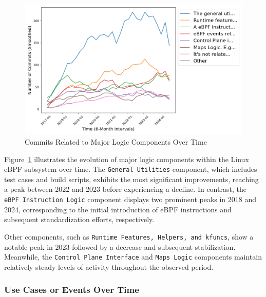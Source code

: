 \begin{figure}[ht]
    \centering
    \includegraphics[width=\linewidth]{feature-analysis/timeline_major_related_logic_component_smoothed.png}
    \caption{Commits Related to Major Logic Components Over Time}
    \label{fig:timeline_major_related_logic_component_smoothed}
\end{figure}

Figure~\ref{fig:timeline_major_related_logic_component_smoothed} illustrates the evolution of major logic components within the Linux eBPF subsystem over time. The \texttt{General Utilities} component, which includes test cases and build scripts, exhibits the most significant improvements, reaching a peak between 2022 and 2023 before experiencing a decline. In contrast, the \texttt{eBPF Instruction Logic} component displays two prominent peaks in 2018 and 2024, corresponding to the initial introduction of eBPF instructions and subsequent standardization efforts, respectively.

Other components, such as \texttt{Runtime Features, Helpers, and kfuncs}, show a notable peak in 2023 followed by a decrease and subsequent stabilization. Meanwhile, the \texttt{Control Plane Interface} and \texttt{Maps Logic} components maintain relatively steady levels of activity throughout the observed period.

\subsubsection{Use Cases or Events Over Time}


